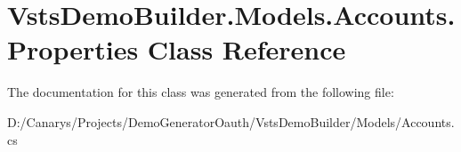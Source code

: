 \hypertarget{class_vsts_demo_builder_1_1_models_1_1_accounts_1_1_properties}{}\section{Vsts\+Demo\+Builder.\+Models.\+Accounts.\+Properties Class Reference}
\label{class_vsts_demo_builder_1_1_models_1_1_accounts_1_1_properties}


The documentation for this class was generated from the following file\+:\begin{DoxyCompactItemize}
\item 
D\+:/\+Canarys/\+Projects/\+Demo\+Generator\+Oauth/\+Vsts\+Demo\+Builder/\+Models/Accounts.\+cs\end{DoxyCompactItemize}
